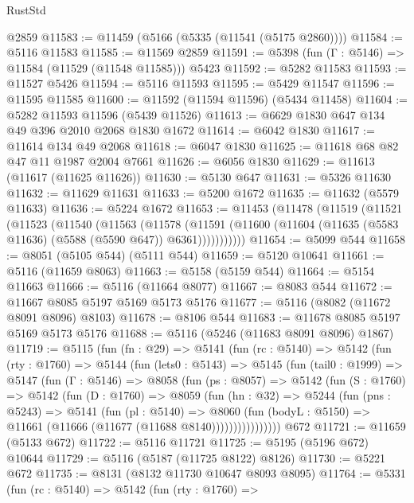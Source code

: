 \begin{lexlean}{RustStd}
\begin{coremodule}
{\begin{coremodule}
{{{{{{{{{{{{{{{{{{{{{{{{{{{{{{{    @2859
@11583 := @11459 (@5166 (@5335 (@11541 (@5175 @2860))))
@11584 := @5116 @11583
@11585 := @11569 @2859
@11591 := @5398 (fun (Γ : @5146) => @11584 (@11529 (@11548 @11585))) @5423
@11592 := @5282 @11583
@11593 := @11527 @5426
@11594 := @5116 @11593
@11595 := @5429 @11547
@11596 := @11595 @11585
@11600 := @11592 (@11594 @11596) (@5434 @11458)
@11604 := @5282 @11593 @11596 (@5439 @11526)
@11613 := @6629 @1830 @647 @134 @49 @396 @2010 @2068 @1830 @1672
@11614 := @6042 @1830
@11617 := @11614 @134 @49 @2068
@11618 := @6047 @1830
@11625 := @11618 @68 @82 @47 @11 @1987 @2004 @7661
@11626 := @6056 @1830
@11629 := @11613 (@11617 (@11625 @11626))
@11630 := @5130 @647
@11631 := @5326 @11630
@11632 := @11629 @11631
@11633 := @5200 @1672
@11635 := @11632 (@5579 @11633)
@11636 := @5224 @1672
@11653 := @11453
    (@11478
      (@11519
        (@11521
          (@11523
            (@11540
              (@11563
                (@11578
                  (@11591
                    (@11600 (@11604 (@11635 (@5583 @11636) (@5588 (@5590 @647)) @6361)))))))))))
@11654 := @5099 @544
@11658 := @8051 (@5105 @544) (@5111 @544)
@11659 := @5120 @10641
@11661 := @5116 (@11659 @8063)
@11663 := @5158 (@5159 @544)
@11664 := @5154 @11663
@11666 := @5116 (@11664 @8077)
@11667 := @8083 @544
@11672 := @11667 @8085 @5197 @5169 @5173 @5176
@11677 := @5116 (@8082 (@11672 @8091 @8096) @8103)
@11678 := @8106 @544
@11683 := @11678 @8085 @5197 @5169 @5173 @5176
@11688 := @5116 (@5246 (@11683 @8091 @8096) @1867)
@11719 := @5115
    (fun (fn : @29) =>
    @5141
      (fun (rc : @5140) =>
      @5142
        (fun (rty : @1760) =>
        @5144
          (fun (lets0 : @5143) =>
          @5145
            (fun (tail0 : @1999) =>
            @5147
              (fun (Γ : @5146) =>
              @8058
                (fun (ps : @8057) =>
                @5142
                  (fun (S : @1760) =>
                  @5142
                    (fun (D : @1760) =>
                    @8059
                      (fun (hn : @32) =>
                      @5244
                        (fun (pns : @5243) =>
                        @5141
                          (fun (pl : @5140) =>
                          @8060
                            (fun (bodyL : @5150) =>
                            @11661 (@11666 (@11677 (@11688 @8140))))))))))))))))
    @672
@11721 := @11659 (@5133 @672)
@11722 := @5116 @11721
@11725 := @5195 (@5196 @672) @10644
@11729 := @5116 (@5187 (@11725 @8122) @8126)
@11730 := @5221 @672
@11735 := @8131 (@8132 @11730 @10647 @8093 @8095)
@11764 := @5331
    (fun (rc : @5140) =>
    @5142
      (fun (rty : @1760) =>
}}}}}}}}}}}}}}}}}}}}}}}}}}}}}}}
\end{coremodule}}
\end{coremodule}
\end{lexlean}
